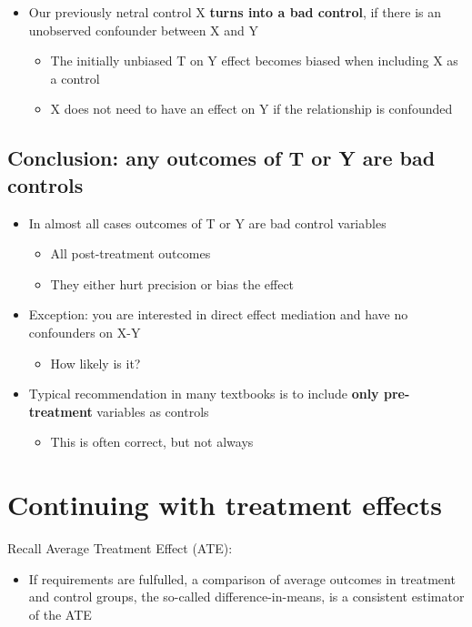 \documentclass[10pt]{article}
\begin{document}
\begin{itemize}
    \item Our previously netral control X \textbf{turns into a bad control}, if there is an unobserved confounder between X and Y
    \begin{itemize}
        \item The initially unbiased T on Y effect becomes biased when including X as a control 
        \item X does not need to have an effect on Y if the relationship is confounded
    \end{itemize}
\end{itemize}
\subsection{Conclusion: any outcomes of T or Y are bad controls}
\begin{itemize}
    \item In almost all cases outcomes of T or Y are bad control variables
    \begin{itemize}
        \item All post-treatment outcomes 
        \item They either hurt precision or bias the effect
    \end{itemize}
    \item Exception: you are interested in direct effect mediation and have no confounders on X-Y
    \begin{itemize}
        \item How likely is it?
    \end{itemize}
    \item Typical recommendation in many textbooks is to include \textbf{only pre-treatment} variables as controls 
    \begin{itemize}
        \item This is often correct, but not always 
    \end{itemize}
\end{itemize}
\newpage
\section{Continuing with treatment effects}
Recall Average Treatment Effect (ATE): 
\begin{itemize}
    \item If requirements are fulfulled, a comparison of average outcomes in treatment and control groups, the so-called difference-in-means, is a consistent estimator of the ATE
\end{itemize}
\end{document}

